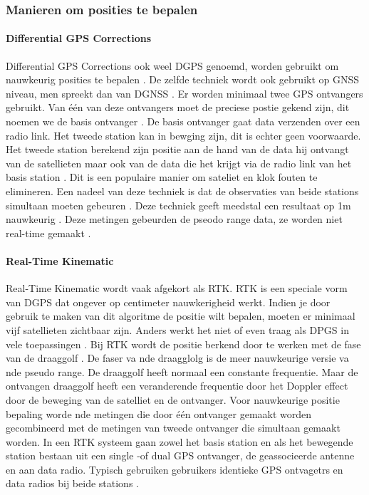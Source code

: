 \subsubsection{Manieren om posities te bepalen}
\paragraph{Differential GPS Corrections}
Differential GPS Corrections ook weel DGPS genoemd, worden gebruikt om nauwkeurig posities  te bepalen \cite{LBibGLONASS2}. De zelfde techniek wordt ook gebruikt op GNSS niveau, men spreekt dan van DGNSS \cite{LBibGNSS8}. Er worden minimaal twee GPS ontvangers gebruikt. Van \'e\'en van deze ontvangers moet de preciese postie gekend zijn, dit noemen we de basis ontvanger \cite{LBibGNSS2,LBibRTK}. De basis ontvanger gaat data verzenden over een radio link.  Het tweede station kan in bewging zijn, dit is echter geen voorwaarde. Het tweede station berekend zijn positie aan de hand van de data hij ontvangt van de satellieten maar ook van de data die het krijgt via de radio link van het basis station \cite{LBibRTK}. Dit is een populaire manier om sateliet en klok fouten te elimineren. Een nadeel van deze techniek is dat de observaties van beide stations simultaan moeten gebeuren \cite{LBibGNSS2}. Deze techniek geeft meedstal een resultaat op 1m nauwkeurig \cite{LBibRTK}. Deze metingen gebeurden de pseodo range data, ze worden niet real-time gemaakt \cite{LBibRTK3}.

\paragraph{Real-Time Kinematic}
Real-Time Kinematic wordt vaak afgekort als RTK. RTK is een speciale vorm van DGPS dat ongever op centimeter nauwkerigheid werkt. Indien je door gebruik te maken van dit algoritme de positie wilt bepalen, moeten er minimaal vijf satellieten zichtbaar zijn. Anders werkt het niet of even traag als DPGS in vele toepassingen \cite{LBibRTK}. Bij RTK wordt de positie berkend door te werken met de fase van de draaggolf \cite{LBibRTK2}. De faser va nde draagglolg is de meer nauwkeurige versie va nde pseudo range. De draaggolf heeft normaal een constante frequentie. Maar de ontvangen draaggolf heeft een veranderende frequentie door het Doppler effect door de beweging van de satelliet en de ontvanger. Voor nauwkeurige positie bepaling worde nde metingen die door \'e\'en ontvanger gemaakt worden gecombineerd met de metingen van tweede ontvanger die simultaan gemaakt worden. In een RTK systeem gaan zowel het basis station en als het bewegende station bestaan uit een single -of dual GPS ontvanger, de geassocieerde antenne en aan data radio. Typisch gebruiken gebruikers identieke GPS ontvagetrs en data radios bij beide stations \cite{LBibRTK3}. 

